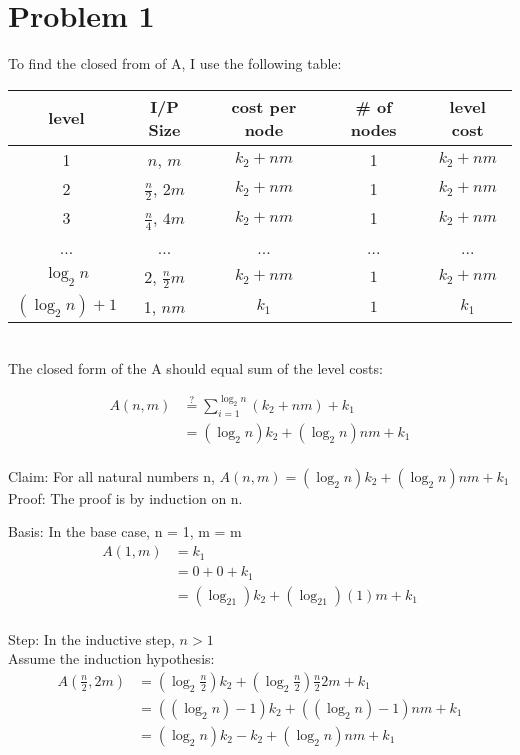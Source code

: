 \documentclass[12pt,letterpaper]{article}
\newenvironment{answer}[1]{
  \section*{Problem #1}
}{\newpage}
\begin{document}
\begin{answer}{1}
To find the closed from of A, I use the following table:\\

\begin{tabular}{c|c|c|c|c}
level & I/P Size & cost per node & \# of nodes & level cost \\ \hline
1 & $n$, $m$ & $k_2 + nm $ & 1 & $k_2 + nm$\\
2 & $\frac{n}{2}$, $2m$ & $k_2 + nm$ & 1 & $k_2 + nm$\\
3 & $\frac{n}{4}$, $4m$ & $k_2 + nm$ & 1 & $k_2 + nm$\\
... & ... & ... & ... & ...\\
$\log_2n$ & 2, $\frac{n}{2}m$ & $k_2 + nm$ & $1$ & $k_2 + nm$\\
$(\log_2n)+1$ & 1, $nm$ & $k_1$ & $1$ & $k_1$\\
\end{tabular}\\



The closed form of the A should equal sum of the level costs:

\begin{align*}
A(n,m) &\stackrel{?}{=}
\sum_{i=1}^{\log_2n} (k_2+nm) + k_1 \\
&= (\log_2n)k_2 + (\log_2n)nm + k_1 \\
\end{align*}

Claim: For all natural numbers n, $A(n,m) = (\log_2n)k_2 + (\log_2n)nm + k_1$ \\

Proof: The proof is by induction on n.


  Basis: In the base case, n = 1, m = m
  \begin{align*}
A(1, m) &= k_1 \\
&= 0 + 0 + k_1 \\
&= (\log_21)k_2 + (\log_21)(1)m + k_1 \\
\end{align*}

  Step: In the inductive step, $n > 1$\\
  Assume the induction hypothesis:
  \begin{align*}
A(\frac{n}{2}, 2m) &= (\log_2\frac{n}{2})k_2 + (\log_2\frac{n}{2})\frac{n}{2}2m + k_1 \\
&= ((\log_2n)-1)k_2 + ((\log_2n)-1)nm + k_1 \\
&= (\log_2n)k_2-k_2 + (\log_2n)nm + k_1
\end{align*}


\end{answer}
\end{document}
